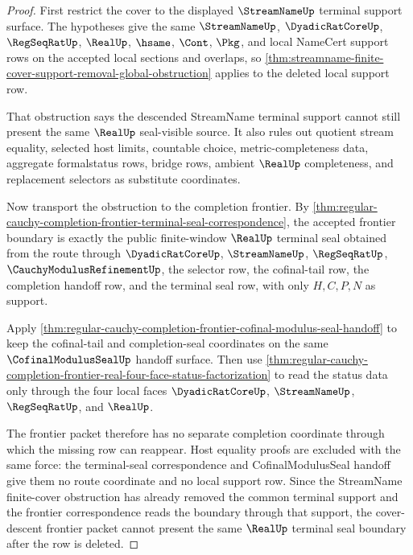 \begin{proof}
First restrict the cover to the displayed $\StreamNameUp$ terminal support surface. The hypotheses give the same $\StreamNameUp$, $\DyadicRatCoreUp$, $\RegSeqRatUp$, $\RealUp$, $\hsame$, $\Cont$, $\Pkg$, and local NameCert support rows on the accepted local sections and overlaps, so \autoref{thm:streamname-finite-cover-support-removal-global-obstruction} applies to the deleted local support row.

That obstruction says the descended StreamName terminal support cannot still present the same $\RealUp$ seal-visible source. It also rules out quotient stream equality, selected host limits, countable choice, metric-completeness data, aggregate formalstatus rows, bridge rows, ambient $\RealUp$ completeness, and replacement selectors as substitute coordinates.

Now transport the obstruction to the completion frontier. By \autoref{thm:regular-cauchy-completion-frontier-terminal-seal-correspondence}, the accepted frontier boundary is exactly the public finite-window $\RealUp$ terminal seal obtained from the route through $\DyadicRatCoreUp$, $\StreamNameUp$, $\RegSeqRatUp$, $\CauchyModulusRefinementUp$, the selector row, the cofinal-tail row, the completion handoff row, and the terminal seal row, with only $H,C,P,N$ as support.

Apply \autoref{thm:regular-cauchy-completion-frontier-cofinal-modulus-seal-handoff} to keep the cofinal-tail and completion-seal coordinates on the same $\CofinalModulusSealUp$ handoff surface. Then use \autoref{thm:regular-cauchy-completion-frontier-real-four-face-status-factorization} to read the status data only through the four local faces $\DyadicRatCoreUp$, $\StreamNameUp$, $\RegSeqRatUp$, and $\RealUp$.

The frontier packet therefore has no separate completion coordinate through which the missing row can reappear. Host equality proofs are excluded with the same force: the terminal-seal correspondence and CofinalModulusSeal handoff give them no route coordinate and no local support row. Since the StreamName finite-cover obstruction has already removed the common terminal support and the frontier correspondence reads the boundary through that support, the cover-descent frontier packet cannot present the same $\RealUp$ terminal seal boundary after the row is deleted.
\end{proof}

